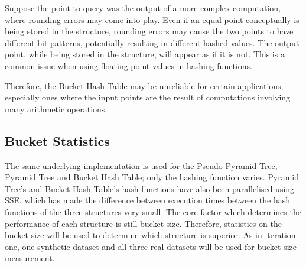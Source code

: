 Suppose the point to query was the output of a more complex computation, where rounding errors may come into play. Even if an equal point conceptually is being stored in the structure, rounding errors may cause the two points to have different bit patterns, potentially resulting in different hashed values. The output point, while being stored in the structure, will appear as if it is not. This is a common issue when using floating point values in hashing functions.

Therefore, the Bucket Hash Table may be unreliable for certain applications, especially ones where the input points are the result of computations involving many arithmetic operations.

\subsection{Bucket Statistics}

The same underlying implementation is used for the Pseudo-Pyramid Tree, Pyramid Tree and Bucket Hash Table; only the hashing function varies. Pyramid Tree's and Bucket Hash Table's hash functions have also been parallelised using SSE, which has made the difference between execution times between the hash functions of the three structures very small. The core factor which determines the performance of each structure is still bucket size. Therefore, statistics on the bucket size will be used to determine which structure is superior. As in iteration one, one synthetic dataset and all three real datasets will be used for bucket size measurement.

